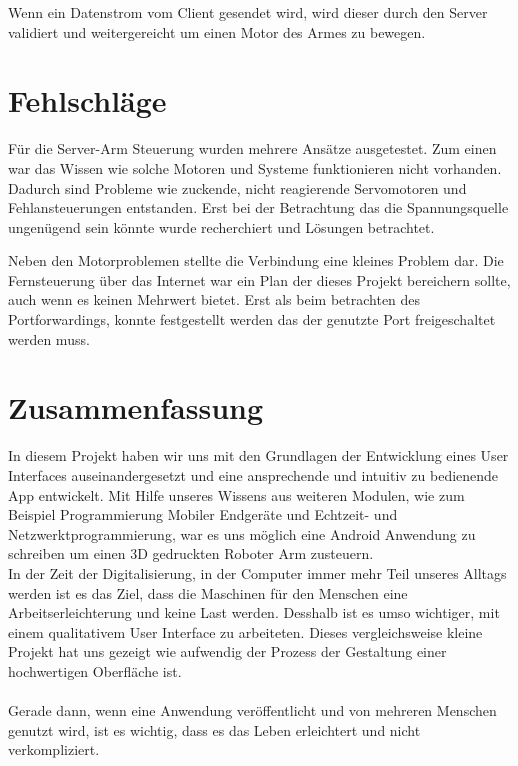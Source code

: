 \documentclass[12pt,					%
							 oneside,			%
							 a4paper,			%
							 halfparskip,		%
							 liststotoc,			%
							 bibtotoc,			%
							 fleqn,				%
							 pointlessnumbers]	%
							 {scrreprt}
\begin{document}
Wenn ein Datenstrom vom Client gesendet wird, wird dieser durch den Server validiert und weitergereicht um einen Motor des Armes zu bewegen.


\chapter{Fehlschläge}
Für die Server-Arm Steuerung wurden mehrere Ansätze ausgetestet. Zum einen war das Wissen wie solche Motoren und Systeme funktionieren nicht vorhanden. Dadurch sind Probleme wie zuckende, nicht reagierende Servomotoren und Fehlansteuerungen entstanden. Erst bei der Betrachtung das die Spannungsquelle ungenügend sein könnte wurde recherchiert\cite{I2C} und Lösungen betrachtet. 

Neben den Motorproblemen stellte die Verbindung eine kleines Problem dar. Die Fernsteuerung über das Internet war ein Plan der dieses Projekt bereichern sollte, auch wenn es keinen Mehrwert bietet. Erst als beim betrachten des Portforwardings, konnte festgestellt werden das der genutzte Port freigeschaltet werden muss.
\chapter{Zusammenfassung}	
In diesem Projekt haben wir uns mit den Grundlagen der Entwicklung eines User Interfaces auseinandergesetzt und eine ansprechende und intuitiv zu bedienende App entwickelt. Mit Hilfe unseres Wissens aus weiteren Modulen, wie zum Beispiel \glqq{}Programmierung Mobiler Endgeräte\grqq{} und \glqq{}Echtzeit- und Netzwerktprogrammierung\grqq{}, war es uns möglich eine Android Anwendung zu schreiben um einen 3D gedruckten Roboter Arm zusteuern. 
\\
In der Zeit der Digitalisierung, in der Computer immer mehr Teil unseres Alltags werden ist es das Ziel, dass die Maschinen für den Menschen eine Arbeitserleichterung und keine Last werden. Desshalb ist es umso wichtiger, mit einem qualitativem User Interface zu arbeiteten. Dieses vergleichsweise kleine Projekt hat uns gezeigt wie aufwendig der Prozess der Gestaltung einer hochwertigen Oberfläche ist.\\ \\
Gerade dann, wenn eine Anwendung veröffentlicht und von mehreren Menschen genutzt wird, ist es wichtig, dass es das Leben erleichtert und nicht verkompliziert.
\end{document}
